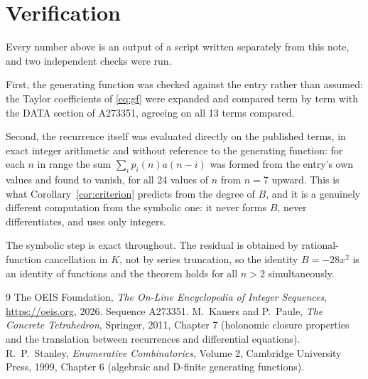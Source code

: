 \documentclass[11pt,a4paper]{article}
\theoremstyle{plain}
\theoremstyle{definition}
\begin{document}
\section{Verification}

Every number above is an output of a script written separately from this note, and two
independent checks were run.

First, the generating function was checked against the entry rather than assumed: the
Taylor coefficients of \eqref{eq:gf} were expanded and compared term by term with the DATA
section of A273351, agreeing on all 13 terms compared.

Second, the recurrence itself was evaluated directly on the published terms, in exact
integer arithmetic and without reference to the generating function: for each $n$ in range
the sum $\sum_{i}p_{i}(n)a(n-i)$ was formed from the entry's own values and found to
vanish, for all 24 values of $n$ from $n=7$ upward. This is what
Corollary~\ref{cor:criterion} predicts from the degree of $B$, and it is a genuinely
different computation from the symbolic one: it never forms $B$, never differentiates, and
uses only integers.

The symbolic step is exact throughout. The residual is obtained by rational-function
cancellation in $K$, not by series truncation, so the identity $B=- 28 x^{2}$ is an
identity of functions and the theorem holds for all $n>2$ simultaneously.

\begin{thebibliography}{9}
 The OEIS Foundation, \emph{The On-Line Encyclopedia of Integer Sequences},
\url{https://oeis.org}, 2026. Sequence A273351.
 M.~Kauers and P.~Paule, \emph{The Concrete Tetrahedron}, Springer, 2011,
Chapter 7 (holonomic closure properties and the translation between recurrences and
differential equations).
 R.~P.~Stanley, \emph{Enumerative Combinatorics}, Volume 2, Cambridge
University Press, 1999, Chapter 6 (algebraic and D-finite generating functions).
\end{thebibliography}
\end{document}
